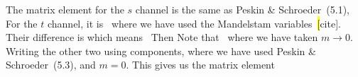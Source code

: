 \documentclass[11pt]{article}
\begin{document}
{	The matrix element for the $s$ channel is the same as Peskin \& Schroeder~(5.1),
	For the $t$ channel, it is~\cite[p.~153]{Peskin}
	where we have used the Mandelstam variables~\hl[cite].  Their difference is
	which means~\cite[p.~132]{Peskin}
	Then
	Note that~\cite[p.~132, 153]{Peskin}
	where we have taken $m \to 0$.  Writing the other two using components,
	where we have used Peskin \& Schroeder~(5.3),
	and $m = 0$.  This gives us the matrix element
	}
\end{document}
